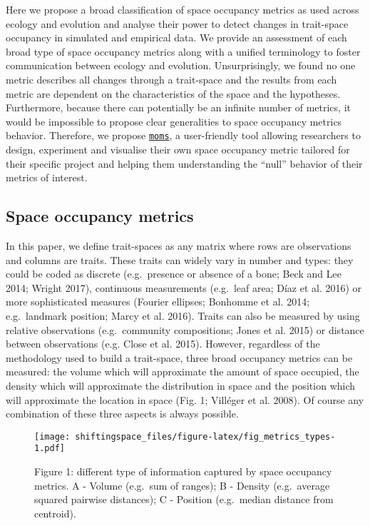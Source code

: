\documentclass[]{article}
\begin{document}
Here we propose a broad classification of space occupancy metrics as
used across ecology and evolution and analyse their power to detect
changes in trait-space occupancy in simulated and empirical data. We
provide an assessment of each broad type of space occupancy metrics
along with a unified terminology to foster communication between ecology
and evolution. Unsurprisingly, we found no one metric describes all
changes through a trait-space and the results from each metric are
dependent on the characteristics of the space and the hypotheses.
Furthermore, because there can potentially be an infinite number of
metrics, it would be impossible to propose clear generalities to space
occupancy metrics behavior. Therefore, we propose
\href{https://tguillerme.shinyapps.io/moms/}{\texttt{moms}}, a
user-friendly tool allowing researchers to design, experiment and
visualise their own space occupancy metric tailored for their specific
project and helping them understanding the ``null'' behavior of their
metrics of interest.

\subsection{Space occupancy metrics}\label{space-occupancy-metrics}

In this paper, we define trait-spaces as any matrix where rows are
observations and columns are traits. These traits can widely vary in
number and types: they could be coded as discrete (e.g.~presence or
absence of a bone; Beck and Lee 2014; Wright 2017), continuous
measurements (e.g.~leaf area; Díaz et al. 2016) or more sophisticated
measures (Fourier ellipses; Bonhomme et al. 2014; e.g.~landmark
position; Marcy et al. 2016). Traits can also be measured by using
relative observations (e.g.~community compositions; Jones et al. 2015)
or distance between observations (e.g. Close et al. 2015). However,
regardless of the methodology used to build a trait-space, three broad
occupancy metrics can be measured: the volume which will approximate the
amount of space occupied, the density which will approximate the
distribution in space and the position which will approximate the
location in space (Fig. 1; Villéger et al. 2008). Of course any
combination of these three aspects is always possible.

\begin{figure}
\centering
\texttt{[image: shiftingspace\_files/figure-latex/fig\_metrics\_types-1.pdf]}
\caption{Figure 1: different type of information captured by space
occupancy metrics. A - Volume (e.g.~sum of ranges); B - Density
(e.g.~average squared pairwise distances); C - Position (e.g.~median
distance from centroid).}
\end{figure}
\end{document}

